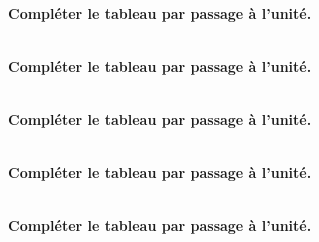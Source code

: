 \exercice \diff[1] \\
\textbf{Compléter le tableau par passage à l'unité.}

\newpage
\phantom{0}

\exercice \diff[1] \\
\textbf{Compléter le tableau par passage à l'unité.}

\exercice \diff[1] \\
\textbf{Compléter le tableau par passage à l'unité.}

\exercice \diff[1] \\
\textbf{Compléter le tableau par passage à l'unité.}

\exercice \diff[1] \\
\textbf{Compléter le tableau par passage à l'unité.}

